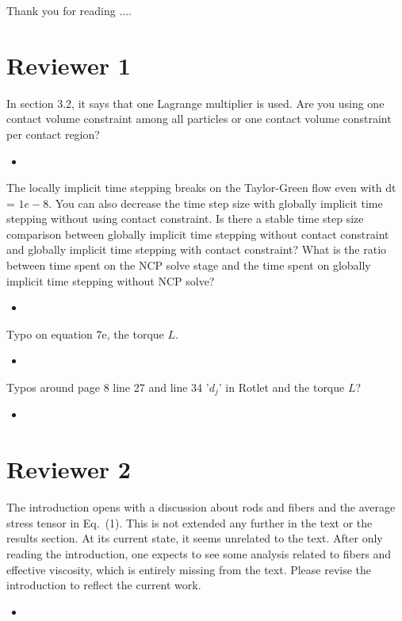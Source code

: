 \documentclass[11pt]{article}
\newcommand{\comment}[1]{{\color{blue} #1}}
\begin{document}
Thank you for reading ....

\section*{Reviewer 1}
\noindent
\comment{In section 3.2, it says that one Lagrange multiplier is used.
Are you using one contact volume constraint among all particles or one
contact volume constraint per contact region?}
\begin{itemize}
  \item
\end{itemize}

\noindent
\comment{The locally implicit time stepping breaks on the Taylor-Green
  flow even with dt = $1e-8$. You can also decrease the time step size
  with globally implicit time stepping without using contact constraint.
  Is there a stable time step size comparison between globally implicit
  time stepping without contact constraint and globally implicit time
  stepping with contact constraint? What is the ratio between time spent
  on the NCP solve stage and the time spent on globally implicit time
  stepping without NCP solve?}
\begin{itemize}
  \item
\end{itemize}

\noindent
\comment{Typo on equation 7e, the torque $L$.}
\begin{itemize}
  \item
\end{itemize}

\noindent
\comment{Typos around page 8 line 27 and line 34 '$d_j$' in Rotlet and the
torque $L$?}
\begin{itemize}
  \item
\end{itemize}


\section*{Reviewer 2}
\noindent
\comment{The introduction opens with a discussion about rods and fibers
  and the average stress tensor in Eq.~(1). This is not extended any
  further in the text or the results section. At its current state, it
  seems unrelated to the text. After only reading the introduction, one
  expects to see some analysis related to fibers and effective
viscosity, which is entirely missing from the text. Please revise the
introduction to reflect the current work.}
\begin{itemize}
  \item
\end{itemize}
\end{document}
